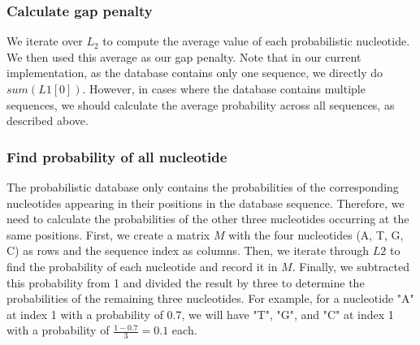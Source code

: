 \documentclass{article}
\begin{document}
\subsubsection*{Calculate gap penalty}
\label{sec:gap}
We iterate over $L_2$ to compute the average value of each probabilistic nucleotide. We then used this average as our gap penalty. Note that in our current implementation, as the database contains only one sequence, we directly do $sum(L1[0])$. However, in cases where the database contains multiple sequences, we should calculate the average probability across all sequences, as described above.\\

\subsubsection*{Find probability of all nucleotide}
\label{sec:nucprob}

The probabilistic database only contains the probabilities of the corresponding nucleotides appearing in their positions in the database sequence. Therefore, we need to calculate the probabilities of the other three nucleotides occurring at the same positions. First, we create a matrix \( M \) with the four nucleotides (A, T, G, C) as rows and the sequence index as columns. Then, we iterate through \( L2 \) to find the probability of each nucleotide and record it in \( M \). Finally, we subtracted this probability from 1 and divided the result by three to determine the probabilities of the remaining three nucleotides. For example, for a nucleotide "A" at index 1 with a probability of 0.7, we will have "T", "G", and "C" at index 1 with a probability of \( \frac{1-0.7}{3} = 0.1 \) each.\\
\end{document}
